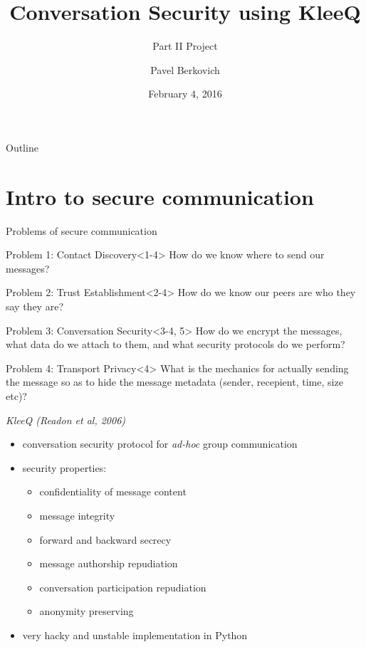 \documentclass{beamer}
\title{Conversation Security using KleeQ}
\subtitle{Part II Project}
\author{Pavel Berkovich}
\institute[University of Cambridge] %
{
  \inst{}%
  University of Cambridge \\ 
  \vspace{1cm}
  \inst{}%
  \Small{Supervised by Dr.~Richard Clayton}
}
\date{February 4, 2016}
\begin{document}
\begin{frame}
  \titlepage
\end{frame}

\begin{frame}{Outline}
  \tableofcontents
\end{frame}

\section{Intro to secure communication}
\begin{frame}{Problems of secure communication}
    \begin{block}{Problem 1: Contact Discovery}<1-4>
        How do we know where to send our messages?
    \end{block}
    \pause
    \begin{block}{Problem 2: Trust Establishment}<2-4>
        How do we know our peers are who they say they are?
    \end{block}
    \pause
    \begin{block}{Problem 3: Conversation Security}<3-4, 5>
        How do we encrypt the messages, what data do we attach to them, and what security protocols do we perform?
    \end{block}
    \pause
    \begin{block}{Problem 4: Transport Privacy}<4>
        What is the mechanics for actually sending the message so as to hide the message metadata (sender, recepient, time, size etc)?
    \end{block}
\end{frame}

\begin{frame}{\textit{KleeQ (Readon et al, 2006)}}
    \begin{itemize}
        \item conversation security protocol for \textit{ad-hoc} group communication
        \item security properties:
            \begin{itemize}
                \item confidentiality of message content
                \item message integrity
                \item forward and backward secrecy
                \item message authorship repudiation
                \item conversation participation repudiation
                \item anonymity preserving
            \end{itemize}
        \item very hacky and unstable implementation in Python
    \end{itemize}
\end{frame}
\end{document}
